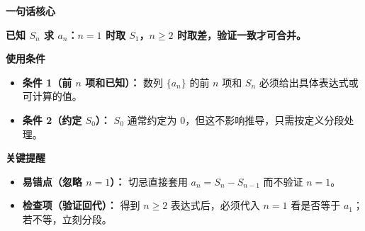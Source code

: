 \begin{summarybox}

	\textbf{\textcolor{CSummary}{一句话核心}}

	\textbf{已知 $S_n$ 求 $a_n$：$n=1$ 时取 $S_1$，$n\ge2$ 时取差，验证一致才可合并。}

	\medskip
	\textbf{\textcolor{CSummary}{使用条件}}
	\begin{itemize}[leftmargin=*, itemsep=0.5em, topsep=0.4em]
		\item \textbf{条件 1（前 $n$ 项和已知）：} 数列 $\{a_n\}$ 的前 $n$ 项和 $S_n$ 必须给出具体表达式或可计算的值。
		\item \textbf{条件 2（约定 $S_0$）：} $S_0$ 通常约定为 $0$，但这不影响推导，只需按定义分段处理。
	\end{itemize}

	\medskip
	\textbf{\textcolor{CSummary}{关键提醒}}
	\begin{itemize}[leftmargin=*, itemsep=0.5em, topsep=0.4em]
		\item \textbf{易错点（忽略 $n=1$）：} 切忌直接套用 $a_n=S_n-S_{n-1}$ 而不验证 $n=1$。
		\item \textbf{检查项（验证回代）：} 得到 $n\ge2$ 表达式后，必须代入 $n=1$ 看是否等于 $a_1$；若不等，立刻分段。
	\end{itemize}
\end{summarybox}
